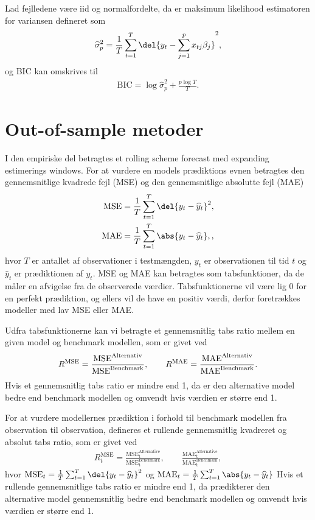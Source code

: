Lad fejlledene være iid og normalfordelte, da er maksimum likelihood estimatoren for variansen defineret som
\begin{align*}
\widehat{\sigma}_p^2 = \frac{1}{T} \sum_{t=1}^{T} \del{y_t - \sum_{j=1}^p x_{tj}\beta_j}^2,
\end{align*}
og BIC kan omskrives til
\begin{align*}
\text{BIC} = \log \widehat{\sigma}^2_p + \frac{p \log T}{T}.
\end{align*}

\section{Out-of-sample metoder}
I den empiriske del betragtes et rolling scheme forecast med expanding estimerings windows.
For at vurdere en models prædiktions evnen betragtes den gennemsnitlige kvadrede fejl (MSE) og den gennemsnitlige absolutte fejl (MAE)
\begin{align}
\text{MSE} & =  \frac{1}{T} \sum_{t=1}^{T} \del{y_{t} - \widehat{y}_{t}}^2 \label{eq:mse}, \\
\text{MAE} & =  \frac{1}{T} \sum_{t=1}^{T} \abs{y_{t} - \widehat{y}_{t}}, \label{eq:mae} ,
\end{align} 
hvor $T$ er antallet af observationer i testmængden, $y_{t}$ er observationen til tid $t$ og $\widehat{y}_{t}$ er prædiktionen af $y_{t}$.
MSE og MAE kan betragtes som tabsfunktioner, da de måler en afvigelse fra de observerede værdier.
Tabsfunktionerne vil være lig 0 for en perfekt prædiktion, og ellers vil de have en positiv værdi, derfor foretrækkes modeller med lav MSE eller MAE.

Udfra tabsfunktionerne kan vi betragte et gennemsnitlig tabs ratio mellem en given model og benchmark modellen, som er givet ved
\begin{align*}
R^{\text{\text{MSE}}} = \frac{\text{MSE}^{\text{Alternativ}}}{\text{MSE}^{\text{Benchmark}}}, \qquad R^{\text{MAE}} = \frac{\text{MAE}^{\text{Alternativ}}}{\text{MAE}^{\text{Benchmark}}}.
\end{align*} 
Hvis et gennemsnitlig tabs ratio er mindre end 1, da er den alternative model bedre end benchmark modellen og omvendt hvis værdien er større end 1. 

For at vurdere modellernes prædiktion i forhold til benchmark modellen fra observation til observation, defineres et rullende gennemsnitlig kvadreret og absolut tabs ratio, som er givet ved
\begin{align*}
R_{t}^\text{MSE} =\frac{\text{MSE}_\text{t}^\text{Alternative}}{\text{MSE}_\text{t}^\text{Benchmark}}, \qquad\frac{\text{MAE}_\text{t}^\text{Alternative}}{\text{MAE}_\text{t}^\text{Benchmark}},
\end{align*}
hvor $\text{MSE}_t = \frac{1}{T} \sum_{t =1}^{T} \del{y_t - \widehat{y}_t}^2$ og $\text{MAE}_t = \frac{1}{T} \sum_{t = 1}^{T} \abs{y_t - \widehat{y}_t}$
Hvis et rullende gennemsnitlige tabs ratio er mindre end 1, da prædikterer den alternative model gennemsnitlig bedre end benchmark modellen og omvendt hvis værdien er større end 1.

